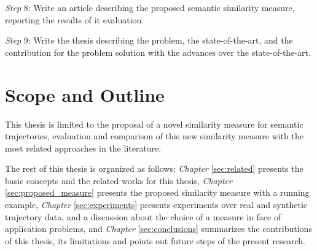 \textit{Step} 8: Write an article describing the proposed semantic similarity measure, reporting the results of it evaluation.

\textit{Step} 9: Write the thesis describing the problem, the state-of-the-art, and the contribution for the problem solution with the advances over the state-of-the-art.

\section{Scope and Outline}

This thesis is limited to the proposal of a novel similarity measure for semantic trajectories, evaluation and comparison of this new similarity measure with the most related approaches in the literature. 

The rest of this thesis is organized as follows: \textit{Chapter} \ref{sec:related} presents the basic concepts and the related works for this thesis, \textit{Chapter} \ref{sec:proposed_measure} presents the proposed similarity measure with a running example, \textit{Chapter} \ref{sec:experiments} presents experiments over real and synthetic trajectory data, and a discussion about the choice of a measure in face of application problems, and \textit{Chapter} \ref{sec:conclusions} summarizes the contributions of this thesis, its limitations and points out future steps of the present research.
